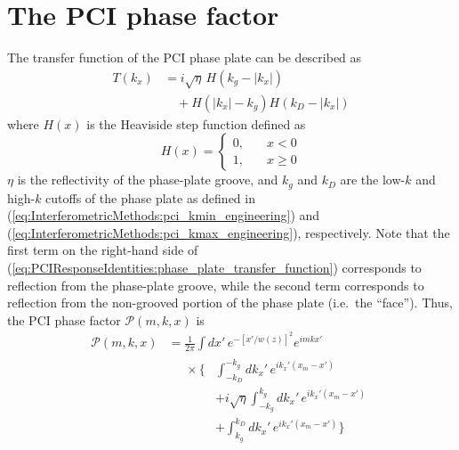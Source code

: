 \section{The PCI phase factor}
The transfer function of the PCI phase plate can be described as
\begin{equation}
  \begin{aligned}
    T(k_x)
    &=
    i \sqrt{\eta} \, H(k_g - |k_x|)
    \\
    &\quad +
    H(|k_x| - k_g)
    H(k_D - |k_x|)
  \end{aligned}
  \label{eq:PCIResponseIdentities:phase_plate_transfer_function}
\end{equation}
where $H(x)$ is the Heaviside step function defined as
\begin{equation}
  H(x)
  =
  \begin{cases}
    0, \quad &x < 0 \\
    1, \quad &x \geq 0
  \end{cases}
  \label{eq:PCIResponseIdentities:Heaviside_step_function}
\end{equation}
$\eta$ is the reflectivity of the phase-plate groove, and
$k_g$ and $k_D$ are the low-$k$ and high-$k$ cutoffs of the phase plate
as defined in
(\ref{eq:InterferometricMethods:pci_kmin_engineering}) and
(\ref{eq:InterferometricMethods:pci_kmax_engineering}), respectively.
Note that the first term on the right-hand side of
(\ref{eq:PCIResponseIdentities:phase_plate_transfer_function})
corresponds to reflection from the phase-plate groove, while
the second term corresponds to reflection
from the non-grooved portion of the phase plate (i.e.\ the ``face'').
Thus, the PCI phase factor $\mathcal{P}(m, k, x)$ is
\begin{equation}
  \begin{aligned}
    \mathcal{P}(m, k, x)
    &=
    \frac{1}{2 \pi}
    \int dx' \,
    e^{-\left[ x' / w(z) \right]^2}
    e^{i m k x'}
    \\
    &\begin{aligned}
      \quad
      \times
      \Biggl\{%
        &\int_{-k_D}^{-k_g} dk_x' \,
        e^{i k_x' (x_m - x')}
        \\
        &+
        i \sqrt{\eta}
        \int_{-k_g}^{k_g} dk_x' \,
        e^{i k_x' (x_m - x')}
        \\
        &+
        \int_{k_g}^{k_D} dk_x' \,
        e^{i k_x' (x_m - x')}
      \Biggr\}
    \end{aligned}
  \end{aligned}
  \label{eq:PCIResponseIdentities:mth_diffracted_beam_kx_filtered_phase_factor_near_field_integrals}
\end{equation}



